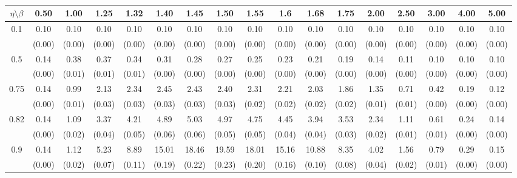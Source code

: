 \documentclass[12pt]{article}  %
\theoremstyle{plain}
\begin{document}
\begin{sidewaystable}[htbp]
\centering
{} 
\label{ATS_10-7}
\ \\
\begin{tabular}{ccccccccccccccccc}
\hline
$\eta \setminus \beta $        & 0.50   & 1.00   & 1.25   & 1.32   & 1.40   & 1.45   & 1.50   & 1.55   & 1.6   & 1.68   & 1.75   & 2.00   & 2.50   & 3.00   & 4.00  &5.00 \\ \hline
\multirow{2}{*}{0.1}  & 0.10& 0.10& 0.10 & 0.10 & 0.10 &  0.10  & 0.10  & 0.10  & 0.10 & 0.10 & 0.10 & 0.10 & 0.10 & 0.10 & 0.10 & 0.10\\
                      & (0.00) & (0.00) & (0.00) & (0.00) & (0.00) & (0.00) & (0.00) & (0.00) & (0.00) & (0.00) & (0.00) & (0.00) & (0.00) & (0.00) & (0.00) & (0.00)\\ \hline
\multirow{2}{*}{0.5}  & 0.14 &0.38& 0.37 & 0.34 & 0.31 &  0.28  & 0.27 &  0.25  & 0.23 & 0.21 & 0.19&  0.14 & 0.11&  0.10 & 0.10 & 0.10 \\
                      & (0.00) & (0.01) & (0.01) & (0.01) & (0.00) & (0.00) & (0.00) & (0.00) & (0.00) & (0.00) & (0.00) & (0.00)  & (0.00) & (0.00) & (0.00)&(0.00)\\ \hline
\multirow{2}{*}{0.75}  & 0.14 &0.99 &2.13 & 2.34 & 2.45 &  2.43  & 2.40 &  2.31  & 2.21 & 2.03 & 1.86 & 1.35 & 0.71 & 0.42 & 0.19 & 0.12\\
                      & (0.00)& (0.01)& (0.03)& (0.03)& (0.03)& (0.03)& (0.03)& (0.02)& (0.02)&  (0.02)&  (0.02)&  (0.01)&  (0.01)& (0.00)& (0.00) & (0.00)\\ \hline
\multirow{2}{*}{0.82}  & 0.14& 1.09 &3.37 & 4.21 & 4.89  & 5.03  & 4.97 &  4.75 &  4.45 & 3.94 & 3.53 & 2.34 & 1.11 & 0.61 & 0.24 & 0.14\\
                      & (0.00)& (0.02)& (0.04)& (0.05)& (0.06)& (0.06)& (0.05)& (0.05)& (0.04)&  (0.04)&  (0.03)&  (0.02)&  (0.01)&  (0.01)&  (0.00)& (0.00)\\ \hline
\multirow{2}{*}{0.9}  & 0.14& 1.12 &5.23 & 8.89 &15.01 & 18.46 & 19.59 & 18.01 & 15.16 &10.88 & 8.35 & 4.02 & 1.56 & 0.79 & 0.29 & 0.15\\
                      & (0.00)& (0.02)& (0.07)& (0.11)& (0.19)& (0.22)& (0.23)& (0.20)& (0.16)&  (0.10)&  (0.08)&  (0.04)& (0.02)& (0.01)& (0.00)& (0.00)\\ \hline                                               

\end{tabular}
\end{sidewaystable}
\end{document}
